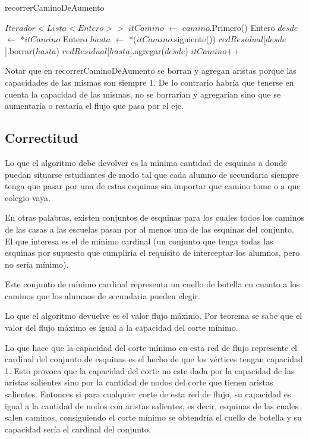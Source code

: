 \begin{algorithm}[]
	\caption{recorrerCaminoDeAumento}

	$Iterador<Lista<Entero>>$ $itCamino$ $\gets$ $camino$.Primero() \;
	 {
		Entero $desde$ $\gets$ *$itCamino$ \;
		Entero $hasta$ $\gets$ *($itCamino$.siguiente()) \;
		$redResidual$[$desde$].borrar($hasta$) \;
		$redResidual$[$hasta$].agregar($desde$) \;
		$itCamino$++ \;
	}
\end{algorithm}

Notar que en recorrerCaminoDeAumento se borran y agregan aristas porque las
capacidades de las mismas son siempre 1. De lo contrario habría que tenerse en
cuenta la capacidad de las mismas, no se borrarían y agregarían sino que se
aumentaría o restaría el flujo que pasa por el eje.

\subsection{Correctitud}

Lo que el algoritmo debe devolver es la mínima cantidad de esquinas a donde
puedan situarse estudiantes de modo tal que cada alumno de secundaria siempre
tenga que pasar por una de estas esquinas sin importar que camino tome o a que
colegio vaya.

En otras palabras, existen conjuntos de esquinas para los cuales todos los
caminos de las casas a las escuelas pasan por al menos una de las esquinas del
conjunto. El que interesa es el de mínimo cardinal (un conjunto que tenga
todas las esquinas por supuesto que cumpliría el requisito de interceptar los
alumnos, pero no sería mínimo).

Este conjunto de mínimo cardinal representa un cuello de botella en cuanto a
los caminos que los alumnos de secundaria pueden elegir.

Lo que el algoritmo devuelve es el valor flujo máximo. Por teorema se sabe que
el valor del flujo máximo es igual a la capacidad del corte mínimo.

Lo que hace que la capacidad del corte mínimo en esta red de flujo represente
el cardinal del conjunto de esquinas es el hecho de que los vértices tengan
capacidad 1. Esto provoca que la capacidad del corte no este dada por la
capacidad de las aristas salientes sino por la cantidad de nodos del corte que
tienen aristas salientes. Entonces si para cualquier corte de esta red de
flujo, su capacidad es igual a la cantidad de nodos con aristas salientes, es
decir, esquinas de las cuales salen caminos, consiguiendo el corte mínimo se
obtendría el cuello de botella y su capacidad sería el cardinal del conjunto.

